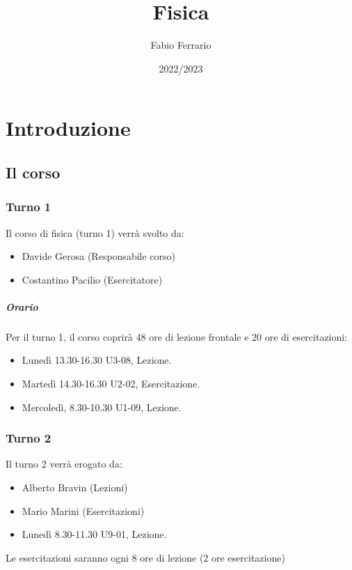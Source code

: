 \documentclass[12pt, a4paper, openany]{book}
\begin{document}
\title{Fisica}
\author{Fabio Ferrario}
\date{2022/2023}
\maketitle

\tableofcontents

\chapter{Introduzione}

\section{Il corso}
\subsection*{Turno 1}
Il corso di fisica (turno 1) verrà svolto da:
\begin{itemize}
    \item Davide Gerosa (Responsabile corso)
    \item Costantino Pacilio (Esercitatore)
\end{itemize}
\paragraph*{Orario} Per il turno 1, il corso coprirà 48 ore di lezione frontale e 20 ore di esercitazioni:
\begin{itemize}
    \item Lunedì 13.30-16.30 U3-08, Lezione.
    \item Martedì 14.30-16.30 U2-02, Esercitazione.
    \item Mercoledì, 8.30-10.30 U1-09, Lezione.
\end{itemize}
\subsection*{Turno 2}
Il turno 2 verrà erogato da:
\begin{itemize}
    \item Alberto Bravin (Lezioni)
    \item Mario Marini (Esercitazioni)
\end{itemize}
\begin{itemize}
    \item Lunedì 8.30-11.30 U9-01, Lezione.

\end{itemize}
Le esercitazioni saranno ogni 8 ore di lezione (2 ore esercitazione)
\end{document}
